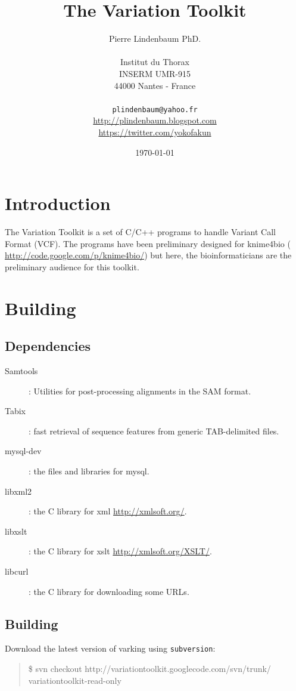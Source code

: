 \documentclass[12pt]{article}
\title{The Variation Toolkit}
\author{Pierre Lindenbaum PhD.
\\
\\Institut du Thorax\\INSERM UMR-915\\44000 Nantes - France\\
\\
\texttt{plindenbaum@yahoo.fr}\\ \url{http://plindenbaum.blogspot.com}\\ \url{https://twitter.com/yokofakun}
\\
}
\date{\today}
\begin{document}
\maketitle

\cleardoublepage
\section{Introduction}
The Variation Toolkit is a set of C/C++ programs to handle Variant Call Format (VCF).
The programs have been preliminary designed for knime4bio ( \url{http://code.google.com/p/knime4bio/}) \cite{pmid21984761}
but here, the bioinformaticians are the preliminary audience for this toolkit.
\section{Building}
\subsection{Dependencies}
\begin{description}
\item[Samtools]: Utilities for post-processing alignments in the SAM format. \cite{pmid19505943}
\item[Tabix]: fast retrieval of sequence features from generic TAB-delimited files. \cite{pmid21208982}
\item[mysql-dev]: the files and libraries for mysql.
\item[libxml2]: the C library for xml \url{http://xmlsoft.org/}.
\item[libxslt]: the C library for xslt \url{http://xmlsoft.org/XSLT/}.
\item[libcurl]: the C library for downloading some URLs.

\end{description}
\subsection{Building}
Download the latest version of varking using \texttt{subversion}:

\begin{quote}
\$ svn checkout http://variationtoolkit.googlecode.com/svn/trunk/ variationtoolkit-read-only
\end{quote}
\end{document}
